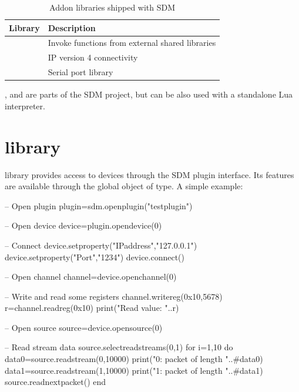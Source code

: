 \documentclass[a4paper,12pt,twoside,extrafontsizes]{memoir}
\begin{document}
\begin{table}[htbp]
	\caption{Addon libraries shipped with SDM}
	\label{tab:sdmluaaddons}
	\begin{tabularx}{\textwidth}{lL}
		\toprule
		Library & Description \\
		\midrule
		
		 & Invoke functions from external shared libraries \\
		 & IP version 4 connectivity \\
		 & Serial port library \\
		
		\bottomrule
	\end{tabularx}
\end{table}

,  and  are parts of the SDM project, but can be also used with a standalone Lua interpreter.

\section[sdm library]{ library}

 library provides access to devices through the SDM plugin interface. Its features are available through the  global object of  type. A simple example:

\begin{breakshellcmds}\begin{luacode}
-- Open plugin
plugin=sdm.openplugin("testplugin")

-- Open device
device=plugin.opendevice(0)

-- Connect
device.setproperty("IPaddress","127.0.0.1")
device.setproperty("Port","1234")
device.connect()

-- Open channel
channel=device.openchannel(0)

-- Write and read some registers
channel.writereg(0x10,5678)
r=channel.readreg(0x10)
print("Read value: "..r)

-- Open source
source=device.opensource(0)

-- Read stream data
source.selectreadstreams({0,1})
for i=1,10 do
    data0=source.readstream(0,10000)
    print("0: packet of length "..#data0)
    data1=source.readstream(1,10000)
    print("1: packet of length "..#data1)
    source.readnextpacket()
end
\end{luacode}\end{breakshellcmds}
\end{document}
